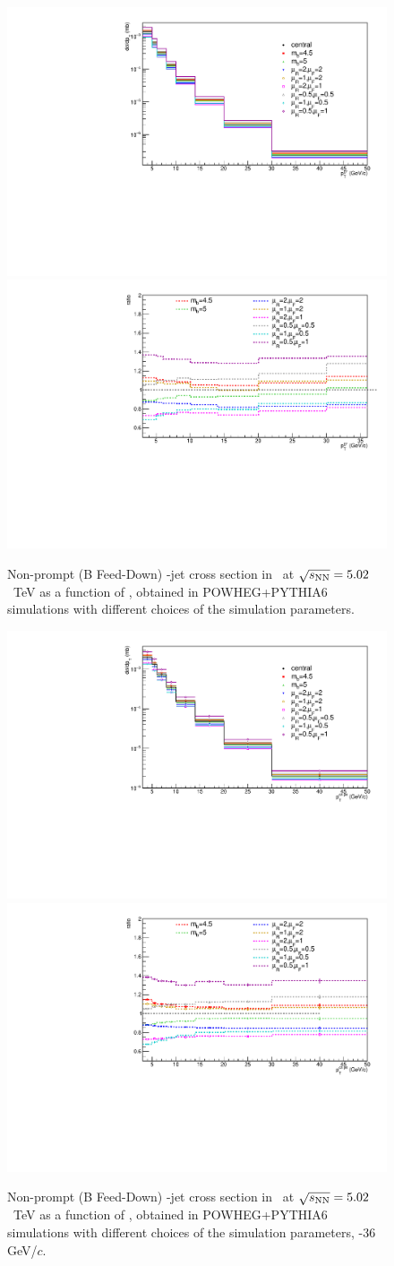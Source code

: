 \begin{figure}[bth]
\begin{center}
\includegraphics[width=.45\textwidth]{pPbplots/simulations/NonPromptspectra_DPt}
\includegraphics[width=.45\textwidth]{pPbplots/simulations/NonPromptspectra_DPt_ratio}
\caption{Non-prompt (B Feed-Down) \Dstar-jet cross section in \pPb\ at $\sqrt{s_{\rm NN}}=5.02$~TeV as a function of \ptd, obtained in POWHEG+PYTHIA6 simulations with different choices of the simulation parameters.} 
\label{fig:BFeedDown_DPtSpectrum_GeneratorLevel_DPtSpectrum}
\end{center}
\end{figure}

\begin{figure}[bth]
\begin{center}
\includegraphics[width=.45\textwidth]{pPbplots/simulations/NonPromptspectra_JetPt_Dpt3_36_effScaled}
\includegraphics[width=.45\textwidth]{pPbplots/simulations/NonPromptspectra_JetPt_Dpt3_36_effScaled_ratio}
\caption{Non-prompt (B Feed-Down) \Dstar-jet cross section in \pPb\ at $\sqrt{s_{\rm NN}}=5.02$~TeV as a function of \ptchjet, obtained in POWHEG+PYTHIA6 simulations
with different choices of the simulation parameters, \ptd{}-36 GeV/$c$.} 
\label{fig:BFeedDown_DPtSpectrum_GeneratorLevel_JetSpectrum}
\end{center}
\end{figure}

